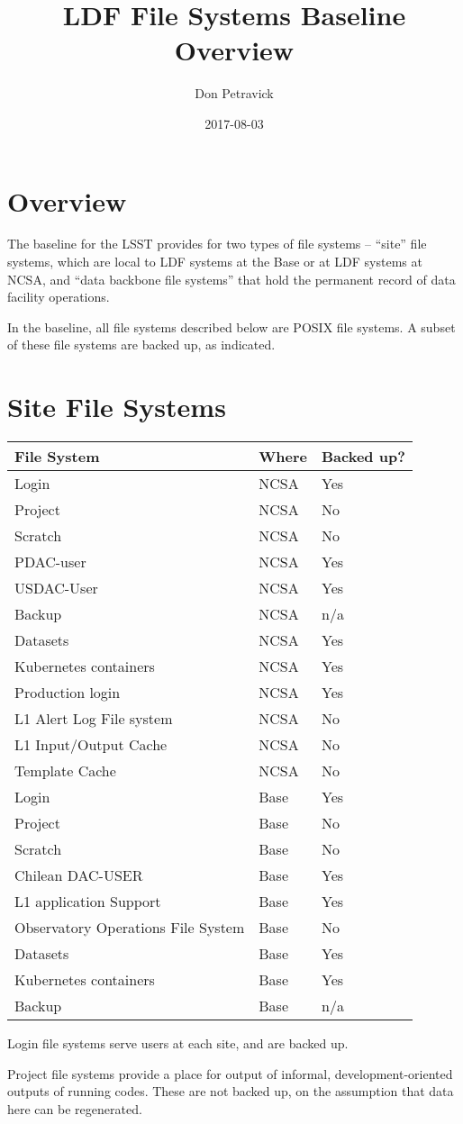 \documentclass[toc,DM,lsstdraft]{lsstdoc}
\title{LDF File Systems Baseline Overview}
\author{Don Petravick}
\date{2017-08-03}
\begin{document}
\maketitle

\section{Overview}

The baseline for the LSST provides for two types of file systems --
``site'' file systems, which are local to LDF systems at the Base or at
LDF systems at NCSA, and ``data backbone file systems'' that hold the
permanent record of data facility operations.

In the baseline, all file systems described below are POSIX file systems. A
subset of these file systems are backed up, as indicated.

\section{Site File Systems}

\begin{longtable}[]{@{}lll@{}}
\hline
\textbf{File System} & \textbf{Where} & \textbf{Backed up?}\tabularnewline
\hline
\endhead
Login & NCSA & Yes\tabularnewline
Project & NCSA & No\tabularnewline
Scratch & NCSA & No\tabularnewline
PDAC-user & NCSA & Yes\tabularnewline
USDAC-User & NCSA & Yes\tabularnewline
Backup & NCSA & n/a\tabularnewline
Datasets & NCSA & Yes\tabularnewline
Kubernetes containers & NCSA & Yes\tabularnewline
Production login & NCSA & Yes\tabularnewline
L1 Alert Log File system & NCSA & No\tabularnewline
L1 Input/Output Cache & NCSA & No\tabularnewline
Template Cache & NCSA & No\tabularnewline
Login & Base & Yes\tabularnewline
Project & Base & No\tabularnewline
Scratch & Base & No\tabularnewline
Chilean DAC-USER & Base & Yes\tabularnewline
L1 application Support & Base & Yes\tabularnewline
Observatory Operations File System & Base & No\tabularnewline
Datasets & Base & Yes\tabularnewline
Kubernetes containers & Base & Yes\tabularnewline
Backup & Base & n/a\tabularnewline
\hline
\end{longtable}

Login file systems serve users at each site, and are backed up.

Project file systems provide a place for output of informal,
development-oriented outputs of running codes. These are not backed up,
on the assumption that data here can be regenerated.
\end{document}
